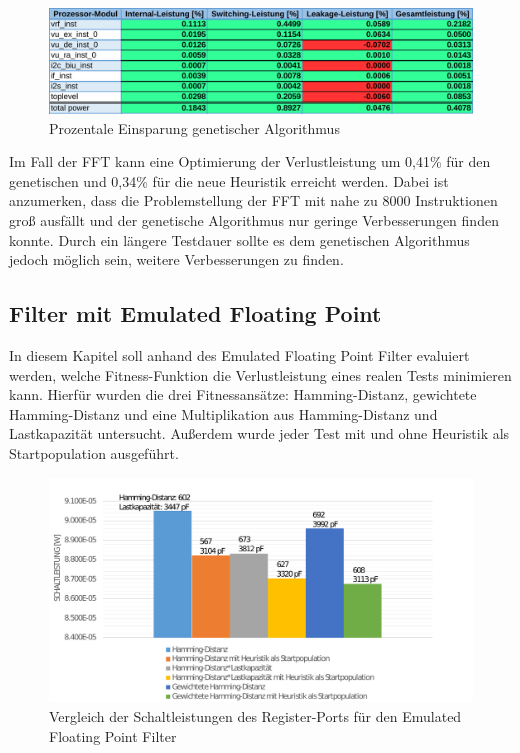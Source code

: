\begin{figure}[H]
	\centering
	\includegraphics[width=\textwidth]{fig/fft_vergleich_genetisch.pdf}
	\caption{Prozentale Einsparung genetischer Algorithmus}
	\label{fig:fft_vergleich_genetisch}
\end{figure}

Im Fall der FFT kann eine Optimierung der Verlustleistung um 0,41\%  f\"ur den genetischen und 0,34\% f\"ur die neue Heuristik erreicht werden. Dabei ist anzumerken, dass die Problemstellung der FFT mit nahe zu 8000 Instruktionen groß ausfällt und der genetische Algorithmus nur geringe Verbesserungen finden konnte. Durch ein längere Testdauer sollte es dem genetischen Algorithmus jedoch möglich sein, weitere Verbesserungen zu finden.

\subsection{Filter mit Emulated Floating Point}
In diesem Kapitel soll anhand des Emulated Floating Point Filter evaluiert werden, welche Fitness-Funktion die Verlustleistung eines realen Tests minimieren kann. Hierf\"ur wurden die drei Fitnessans\"atze: Hamming-Distanz, gewichtete Hamming-Distanz und eine Multiplikation aus Hamming-Distanz und Lastkapazit\"at untersucht. Au\ss{}erdem wurde jeder Test mit und ohne Heuristik als Startpopulation ausgef\"uhrt.

\begin{figure}[H]
	\centering
	\includegraphics[width=\textwidth]{fig/filter_schaltleistung_port_vergleich.pdf}
	\caption{Vergleich der Schaltleistungen des Register-Ports f\"ur den Emulated Floating Point Filter}
	\label{fig:filter_schaltleistung_port_vergleich}
\end{figure}

